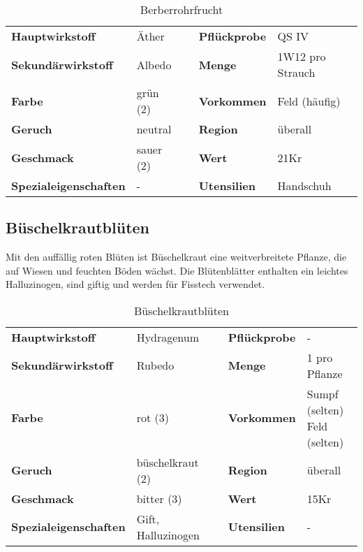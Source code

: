 \begin{table}[h]
\begin{center}
\begin{tabular}{|l|l|p{1cm}|l|l|}
	\cline{1-2} \cline{4-5}
	\textbf{Hauptwirkstoff} & Äther && \textbf{Pflückprobe} & QS IV \\ \cline{1-2} \cline{4-5}
	\textbf{Sekundärwirkstoff} & Albedo && \textbf{Menge} & 1W12 pro Strauch \\ \cline{1-2} \cline{4-5}
	\textbf{Farbe} & grün (2) && \textbf{Vorkommen} & Feld (häufig) \\ \cline{1-2} \cline{4-5}
	\textbf{Geruch} & neutral && \textbf{Region} & überall \\ \cline{1-2} \cline{4-5}
	\textbf{Geschmack} & sauer (2) && \textbf{Wert} & 21Kr \\ \cline{1-2} \cline{4-5}
	\textbf{Spezialeigenschaften} & - && \textbf{Utensilien} & Handschuh \\ \cline{1-2} \cline{4-5}
\end{tabular}
\end{center}
\caption{Berberrohrfrucht}
\label{tab:berberrohrfrucht}
\end{table}


\subsection{Büschelkrautblüten}
Mit den auffällig roten Blüten ist Büschelkraut eine weitverbreitete Pflanze, die auf Wiesen und feuchten Böden wächst. Die Blütenblätter enthalten ein leichtes Halluzinogen, sind giftig und werden für Fisstech verwendet. 

\begin{table}[h] 
\begin{center} 
\begin{tabular}{|l|l|p{1cm}|l|l|} 
  	\cline{1-2} \cline{4-5} 
  	\textbf{Hauptwirkstoff} & Hydragenum && \textbf{Pflückprobe} & - \\ \cline{1-2} \cline{4-5} 
  	\textbf{Sekundärwirkstoff} & Rubedo && \textbf{Menge} & 1 pro Pflanze \\ \cline{1-2} \cline{4-5} 
  	\textbf{Farbe} & rot (3) && \textbf{Vorkommen} & \brcell{Sumpf (selten)\\Feld (selten)} \\ \cline{1-2} \cline{4-5} 
  	\textbf{Geruch} & büschelkraut (2) && \textbf{Region} & überall \\ \cline{1-2} \cline{4-5} 
  	\textbf{Geschmack} & bitter (3) && \textbf{Wert} & 15Kr \\ \cline{1-2} \cline{4-5} 
  	\textbf{Spezialeigenschaften} & Gift, Halluzinogen && \textbf{Utensilien} & - \\ \cline{1-2} \cline{4-5} 
\end{tabular} 
\end{center} 
\caption{Büschelkrautblüten} 
\label{tab:bueschelkrautblueten} 
\end{table}


